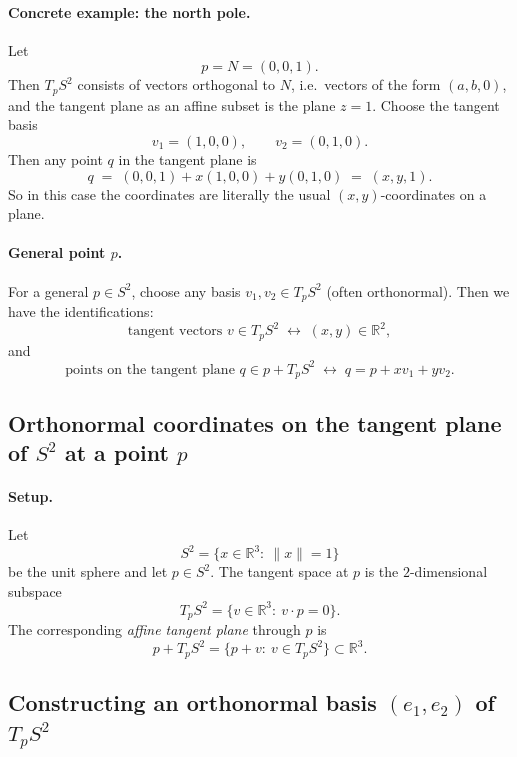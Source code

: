 \documentclass[12pt,a4paper]{article}
\theoremstyle{plain}
\theoremstyle{definition}      %
\begin{document}
	\paragraph{Concrete example: the north pole.}
	Let
	\[
	p = N = (0,0,1).
	\]
	Then $T_pS^2$ consists of vectors orthogonal to $N$, i.e.\ vectors of the form $(a,b,0)$,
	and the tangent plane as an affine subset is the plane $z=1$.
	Choose the tangent basis
	\[
	v_1=(1,0,0),\qquad v_2=(0,1,0).
	\]
	Then any point $q$ in the tangent plane is
	\[
	q \;=\; (0,0,1) + x(1,0,0) + y(0,1,0)
	\;=\; (x,y,1).
	\]
	So in this case the coordinates are literally the usual $(x,y)$-coordinates on a plane.
	
	\paragraph{General point $p$.}
	For a general $p\in S^2$, choose any basis $v_1,v_2\in T_pS^2$ (often orthonormal).
	Then we have the identifications:
	\[
	\text{tangent vectors } v\in T_pS^2
	\;\longleftrightarrow\;
	(x,y)\in\mathbb{R}^2,
	\]
	and
	\[
	\text{points on the tangent plane } q\in p+T_pS^2
	\;\longleftrightarrow\;
	q = p + x v_1 + y v_2.
	\]
	
	
	\subsection*{Orthonormal coordinates on the tangent plane of $S^2$ at a point $p$}
	
	\paragraph{Setup.}
	Let
	\[
	S^2=\{x\in\mathbb{R}^3:\ \|x\|=1\}
	\]
	be the unit sphere and let $p\in S^2$.
	The tangent space at $p$ is the $2$-dimensional subspace
	\[
	T_pS^2=\{v\in\mathbb{R}^3:\ v\cdot p=0\}.
	\]
	The corresponding \emph{affine tangent plane} through $p$ is
	\[
	p+T_pS^2=\{p+v:\ v\in T_pS^2\}\subset\mathbb{R}^3.
	\]
	
	\subsection*{Constructing an orthonormal basis $(e_1,e_2)$ of $T_pS^2$}
	
\end{document}
